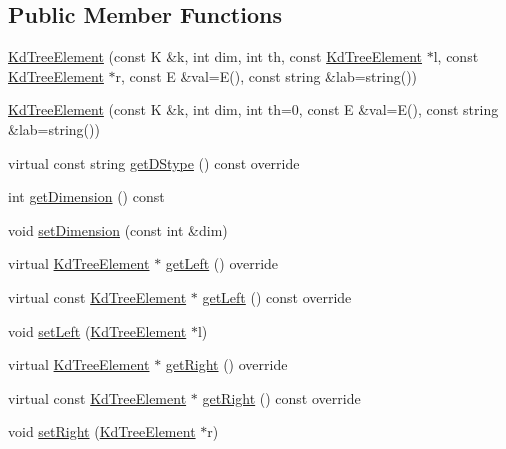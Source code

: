 \subsection*{Public Member Functions}
\begin{DoxyCompactItemize}
\item 
\mbox{\hyperlink{classbridges_1_1datastructure_1_1_kd_tree_element_a5dd9f121e73a5c0643dfb52401472297}{Kd\+Tree\+Element}} (const K \&k, int dim, int th, const \mbox{\hyperlink{classbridges_1_1datastructure_1_1_kd_tree_element}{Kd\+Tree\+Element}} $\ast$l, const \mbox{\hyperlink{classbridges_1_1datastructure_1_1_kd_tree_element}{Kd\+Tree\+Element}} $\ast$r, const E \&val=E(), const string \&lab=string())
\item 
\mbox{\hyperlink{classbridges_1_1datastructure_1_1_kd_tree_element_a5c8f171b78e65a4e07e93282a0f713f6}{Kd\+Tree\+Element}} (const K \&k, int dim, int th=0, const E \&val=E(), const string \&lab=string())
\item 
virtual const string \mbox{\hyperlink{classbridges_1_1datastructure_1_1_kd_tree_element_a76f6d9bfadfdec09d0a8564aa0e33235}{get\+D\+Stype}} () const override
\item 
int \mbox{\hyperlink{classbridges_1_1datastructure_1_1_kd_tree_element_a0321f13830707107198df2d96ff0bc2d}{get\+Dimension}} () const
\item 
void \mbox{\hyperlink{classbridges_1_1datastructure_1_1_kd_tree_element_a9862bde7b85254224963e23dd9bcee29}{set\+Dimension}} (const int \&dim)
\item 
virtual \mbox{\hyperlink{classbridges_1_1datastructure_1_1_kd_tree_element}{Kd\+Tree\+Element}} $\ast$ \mbox{\hyperlink{classbridges_1_1datastructure_1_1_kd_tree_element_a875bfa2dfd88a7740f7bcd28a117c12a}{get\+Left}} () override
\item 
virtual const \mbox{\hyperlink{classbridges_1_1datastructure_1_1_kd_tree_element}{Kd\+Tree\+Element}} $\ast$ \mbox{\hyperlink{classbridges_1_1datastructure_1_1_kd_tree_element_a653597918fbc6e31b84fcf8dbdf67122}{get\+Left}} () const override
\item 
void \mbox{\hyperlink{classbridges_1_1datastructure_1_1_kd_tree_element_a2ca1571186e00b69f73f324bc4c20753}{set\+Left}} (\mbox{\hyperlink{classbridges_1_1datastructure_1_1_kd_tree_element}{Kd\+Tree\+Element}} $\ast$l)
\item 
virtual \mbox{\hyperlink{classbridges_1_1datastructure_1_1_kd_tree_element}{Kd\+Tree\+Element}} $\ast$ \mbox{\hyperlink{classbridges_1_1datastructure_1_1_kd_tree_element_a366e3b0987169220d3a145043be2373d}{get\+Right}} () override
\item 
virtual const \mbox{\hyperlink{classbridges_1_1datastructure_1_1_kd_tree_element}{Kd\+Tree\+Element}} $\ast$ \mbox{\hyperlink{classbridges_1_1datastructure_1_1_kd_tree_element_ae8d6007d3848b72cbfc11d2e29120781}{get\+Right}} () const override
\item 
void \mbox{\hyperlink{classbridges_1_1datastructure_1_1_kd_tree_element_aee269fced2901e0cb580f998457176ca}{set\+Right}} (\mbox{\hyperlink{classbridges_1_1datastructure_1_1_kd_tree_element}{Kd\+Tree\+Element}} $\ast$r)
\end{DoxyCompactItemize}
